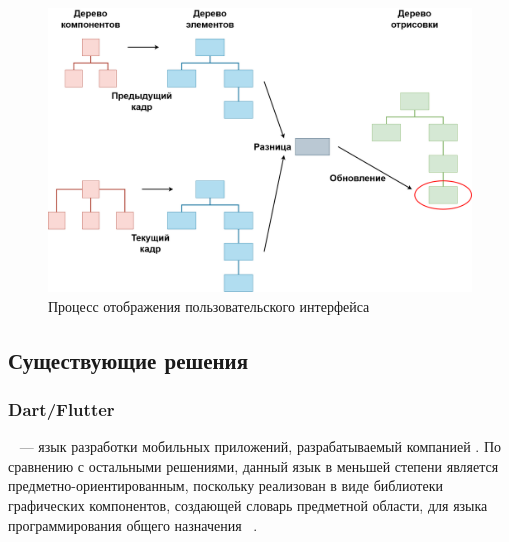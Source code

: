 \begin{figure}[H]
\centering
\includegraphics[width=\linewidth,height=0.9\linewidth,keepaspectratio]{resources/rendering-pipeline.png}
\caption{Процесс отображения пользовательского интерфейса}
\label{render-pipeline}
\end{figure}



\subsection{Существующие решения}
\subsubsection*{Dart/Flutter}
~\cite{flutter-homepage} --- язык разработки
мобильных приложений, разрабатываемый компанией . По
сравнению с остальными решениями, данный язык в меньшей степени является
предметно-ориентированным, поскольку реализован в виде библиотеки
графических компонентов, создающей словарь предметной области, для языка
программирования общего назначения ~\cite{dart-homepage}.

